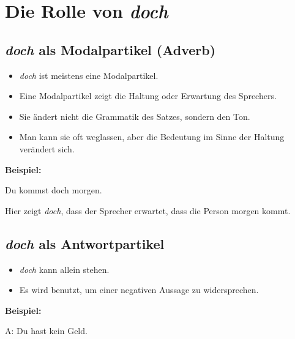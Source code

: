 \documentclass[a4paper]{article}
\title{}
\date{}
\begin{document}
    
    \maketitle
    
    
    \section{Die Rolle von \textit{doch}}
        
        \subsection{\textit{doch} als Modalpartikel (Adverb)}
            
            \begin{itemize}
                \item \textit{doch} ist meistens eine Modalpartikel.
                \item Eine Modalpartikel zeigt die Haltung oder Erwartung des Sprechers.
                \item Sie ändert nicht die Grammatik des Satzes, sondern den Ton.
                \item Man kann sie oft weglassen, aber die Bedeutung im Sinne der Haltung verändert sich.
            \end{itemize}
            
            \textbf{Beispiel:}
            
            Du kommst doch morgen.
            
            Hier zeigt \textit{doch}, dass der Sprecher erwartet, dass die Person morgen kommt.
            
            \bigskip
        
        \subsection{\textit{doch} als Antwortpartikel}
            
            \begin{itemize}
                \item \textit{doch} kann allein stehen.
                \item Es wird benutzt, um einer negativen Aussage zu widersprechen.
            \end{itemize}
            
            \textbf{Beispiel:}
            
            A: Du hast kein Geld.
            
\end{document}
